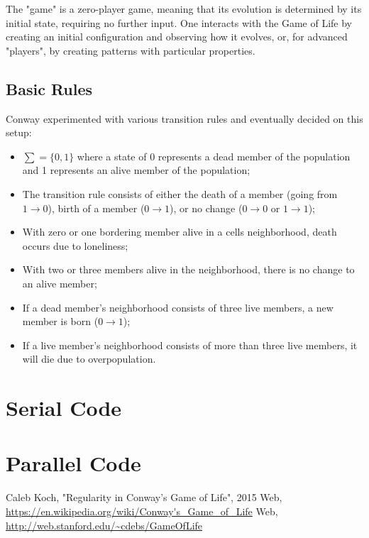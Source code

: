 \documentclass{report}%
\begin{document}
\noindent The "game" is a zero-player game, meaning that its evolution is determined by its initial state, requiring no further input. One interacts with the Game of Life by creating an initial configuration and observing how it evolves, or, for advanced "players", by creating patterns with particular properties.

\section{Basic Rules}
Conway experimented with various transition rules and eventually decided on this setup:
\begin{itemize}

	\item $\sum = \{0, 1\}$ where a state of 0 represents a dead member of the population    and 1 represents an alive member of the population;
	\item The transition rule consists of either the death of a member (going from $1 \rightarrow 0$), birth of a member ($0 \rightarrow 1$), or no change ($0 \rightarrow 0$ or $1 \rightarrow 1$);
	\item With zero or one bordering member alive in a cells neighborhood, death occurs due to loneliness;
	\item With two or three members alive in the neighborhood, there is no change to an alive member;
	\item If a dead member's neighborhood consists of three live members, a new member is born ($0 \rightarrow 1$);
	\item If a live member's neighborhood consists of more than three live members, it will die due to overpopulation.
\end{itemize}













\appendix

\chapter{Serial Code}



\chapter{Parallel Code}



\begin{thebibliography}{9}
 Caleb Koch, "Regularity in Conway's Game of Life", 2015
 Web, \url{https://en.wikipedia.org/wiki/Conway's_Game_of_Life}
 Web, \url{http://web.stanford.edu/~cdebs/GameOfLife}
\end{thebibliography}
\end{document}
